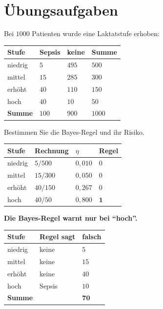 \section{Übungsaufgaben}

\begin{aufgabe}
Bei $1000$ Patienten wurde eine Laktatstufe erhoben:
\begin{center}
{\small
\renewcommand{\arraystretch}{1.5}
\begin{tabular}{@{}P{2.2cm}P{2.0cm}P{2.0cm}P{1.6cm}@{}}
\toprule
\textbf{Stufe} & \textbf{Sepsis} & \textbf{keine} & \textbf{Summe}\\
\midrule
niedrig & $5$ & $495$ & $500$\\
mittel & $15$ & $285$ & $300$\\
erhöht & $40$ & $110$ & $150$\\
hoch & $40$ & $10$ & $50$\\
\midrule
\textbf{Summe} & $100$ & $900$ & $1000$\\
\bottomrule
\end{tabular}}
\end{center}
Bestimmen Sie die Bayes-Regel und ihr Risiko.

\loesung
{}
\begin{center}
{\small
\renewcommand{\arraystretch}{1.48}
\begin{tabular}{@{}P{2.2cm}P{2.4cm}P{2.0cm}P{1.6cm}@{}}
\toprule
\textbf{Stufe} & \textbf{Rechnung} & $\eta$ & \textbf{Regel}\\
\midrule
niedrig & $5/500$ & $0{,}010$ & $0$\\
mittel & $15/300$ & $0{,}050$ & $0$\\
erhöht & $40/150$ & $0{,}267$ & $0$\\
hoch & $40/50$ & $0{,}800$ & $\mathbf{1}$\\
\bottomrule
\end{tabular}}
\end{center}

\begin{center}
\begin{minipage}{0.9\textwidth}
\textbf{Die Bayes-Regel warnt nur bei \enquote{hoch}.}
\end{minipage}
\end{center}

\begin{center}
{\small
\renewcommand{\arraystretch}{1.48}
\begin{tabular}{@{}P{2.2cm}P{2.4cm}P{2.4cm}@{}}
\toprule
\textbf{Stufe} & \textbf{Regel sagt} & \textbf{falsch}\\
\midrule
niedrig & keine & $5$\\
mittel & keine & $15$\\
erhöht & keine & $40$\\
hoch & Sepsis & $10$\\
\midrule
\textbf{Summe} & & $\mathbf{70}$\\
\bottomrule
\end{tabular}}
\end{center}


\end{aufgabe}
